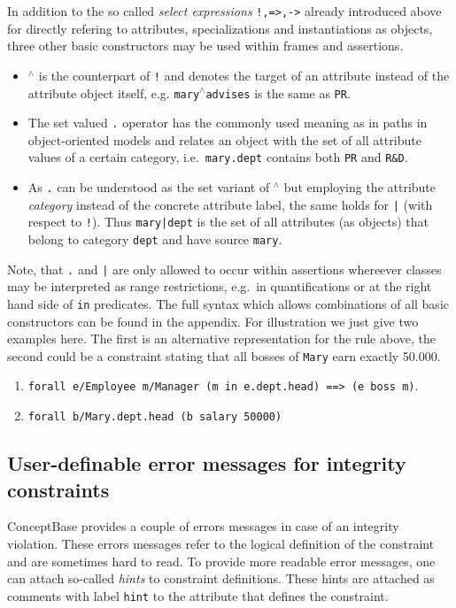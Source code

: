 In addition to the so called {\em select expressions}
{\tt !,=>,->} already introduced above
for directly refering to attributes, specializations
and instantiations as objects,
three other basic constructors may be used within
frames and assertions.

\begin{itemize}
\item $^\land$ is the counterpart of {\tt !} and
denotes the target of an attribute instead of the
attribute object itself, e.g.
{\tt mary}$^\land${\tt advises} is the same as {\tt PR}.
\item The set valued {\tt .} operator has the commonly
used meaning as in paths in object-oriented models
and relates an object with the set of all
attribute values of a certain category,
i.e.\ {\tt mary.dept} contains both {\tt PR} and {\tt R\&D}.
\item As {\tt .} can be understood as the set variant
of $^\land$ but employing the attribute {\em category}
instead of the concrete attribute label, the same
holds for {\tt |} (with respect to {\tt !}).
Thus {\tt mary|dept} is the set of all attributes (as objects)
that belong to category {\tt dept} and have source {\tt mary}.
\end{itemize}
Note, that {\tt .} and {\tt |} are only allowed
to occur within assertions whereever
classes may be interpreted as range restrictions,
e.g.\ in quantifications or at the right hand side
of {\tt in} predicates. The full syntax
which allows combinations of all basic constructors
can be found in the appendix. For illustration we
just give two examples here. The first is an alternative
representation for the rule above, the second
could be a constraint stating that all bosses of {\tt Mary}
earn exactly 50.000.

\begin{enumerate}
\item
{\tt forall e/Employee m/Manager (m in e.dept.head) ==> (e boss m)}.
\item {\tt forall b/Mary.dept.head (b salary 50000)}
\end{enumerate}


\subsection{User-definable error messages for integrity constraints}
\label{sec:ErrMessIC}

ConceptBase provides a couple of errors messages in case of an
integrity violation. These errors messages refer to the logical
definition of the constraint and are sometimes hard to read.
To provide more readable error messages, one can attach so-called {\em
hints\/} to constraint definitions. These hints are attached as comments
with label {\tt hint} to the attribute that defines the constraint.

